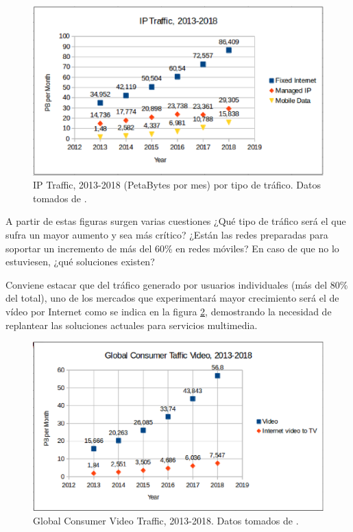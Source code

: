 \documentclass[a4paper,11pt]{book}
\begin{document}
\begin{figure}[htb]
\begin{center}
\hspace*{-0.3cm}
\includegraphics[scale=0.7]{./figuras/IPTraffic2}
\caption[IP Traffic, 2013-2018 (PetaBytes por mes) por tipo de tráfico]{IP Traffic, 2013-2018 (PetaBytes por mes) por tipo de tráfico. Datos tomados de \cite{cisco2014cisco}.}
\label{IP_Traffic_2013-2018_2}
\end{center}
\end{figure}

A partir de estas figuras surgen varias cuestiones ¿Qué tipo de tráfico será el que sufra un mayor aumento y sea más crítico? ¿Están las redes preparadas para soportar un incremento de más del 60\% en redes móviles? En caso de que no lo estuviesen, ¿qué soluciones existen?

Conviene estacar que del tráfico generado por usuarios individuales (más del 80\% del total), uno de los mercados que experimentará mayor crecimiento será el de vídeo por Internet como se indica en la figura \ref{IP_Traffic_2013-2018_video}, demostrando la necesidad de replantear las soluciones actuales para servicios multimedia.

\begin{figure}[htb]
\begin{center}
\includegraphics[scale=0.6]{./figuras/IPTraffic4}
\caption[Global Consumer Video Traffic, 2013-2018]{Global Consumer Video Traffic, 2013-2018. Datos tomados de \cite{cisco2014cisco}.}
\label{IP_Traffic_2013-2018_video}
\end{center}
\end{figure}
\end{document}
